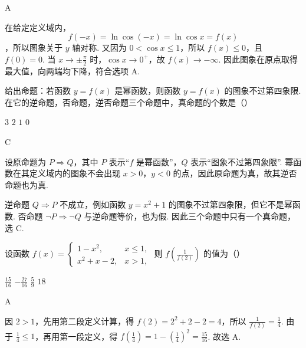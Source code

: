 \begin{answer}
A
\end{answer}

\begin{solution}
在给定定义域内，
\[
f(-x)=\ln\cos(-x)=\ln\cos x=f(x)
\]
，所以图象关于 \(y\) 轴对称. 又因为 \(0<\cos x\leqslant1\)，所以 \(f(x)\leqslant0\)，且 \(f(0)=0\). 当 \(x\to\pm\frac{\pi}{2}\) 时，\(\cos x\to0^+\)，故 \(f(x)\to-\infty\). 因此图象在原点取得最大值，向两端均下降，符合选项 A.
\end{solution}

\begin{problem}
给出命题：若函数 \( y = f(x) \) 是幂函数，则函数 \( y = f(x) \) 的图象不过第四象限. 在它的逆命题，否命题，逆否命题三个命题中，真命题的个数是（\quad）

\choices
    {\(3\)}
    {\(2\)}
    {\(1\)}
    {\(0\)}
\end{problem}

\begin{answer}
C
\end{answer}

\begin{solution}
设原命题为 \(P\Rightarrow Q\)，其中 \(P\) 表示“\(f\) 是幂函数”，\(Q\) 表示“图象不过第四象限”. 幂函数在其定义域内的图象不会出现 \(x>0\)，\(y<0\) 的点，因此原命题为真，故其逆否命题也为真.

逆命题 \(Q\Rightarrow P\) 不成立，例如函数 \(y=x^2+1\) 的图象不过第四象限，但它不是幂函数. 否命题 \(\lnot P\Rightarrow\lnot Q\) 与逆命题等价，也为假. 因此三个命题中只有一个真命题，选 C.
\end{solution}

\begin{problem}
设函数 \( f(x) = \begin{cases}
1 - x^2, & x \leqslant 1,\\
x^2 + x - 2, & x > 1,
\end{cases} \) 则 \( f\left(\frac{1}{f(2)}\right) \) 的值为（\quad）

\choices
    {\(\frac{15}{16}\)}
    {\( -\frac{27}{16} \)}
    {\( \frac{5}{9} \)}
    {\(18\)}
\end{problem}

\begin{answer}
A
\end{answer}

\begin{solution}
因 \(2>1\)，先用第二段定义计算，得 \(f(2)=2^2+2-2=4\)，所以 \(\frac{1}{f(2)}=\frac14\). 由于 \(\frac14\leqslant1\)，再用第一段定义，得 \(f\left(\frac14\right)=1-\left(\frac14\right)^2=\frac{15}{16}\).
故选 A.
\end{solution}

